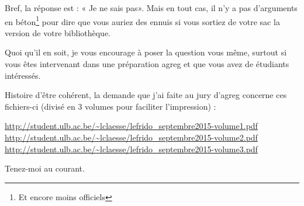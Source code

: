 Bref, la réponse est : « Je ne sais pas». Mais en tout cas, il n'y a pas d'arguments en béton\footnote{Et encore moins officiels} pour dire que vous auriez des ennuis si vous sortiez de votre sac la version de votre bibliothèque.

Quoi qu'il en soit, je vous encourage à poser la question vous même, surtout si vous êtes intervenant dans une préparation agreg et que vous avez de étudiants intéressés. 

Histoire d'être cohérent, la demande que j'ai faite au jury d'agreg concerne ces fichiers-ci (divisé en 3 volumes pour faciliter l'impression) :
\begin{center}
    \url{http://student.ulb.ac.be/~lclaesse/lefrido_septembre2015-volume1.pdf}\\
    \url{http://student.ulb.ac.be/~lclaesse/lefrido_septembre2015-volume2.pdf}\\
    \url{http://student.ulb.ac.be/~lclaesse/lefrido_septembre2015-volume3.pdf}
\end{center}

Tenez-moi au courant. 
